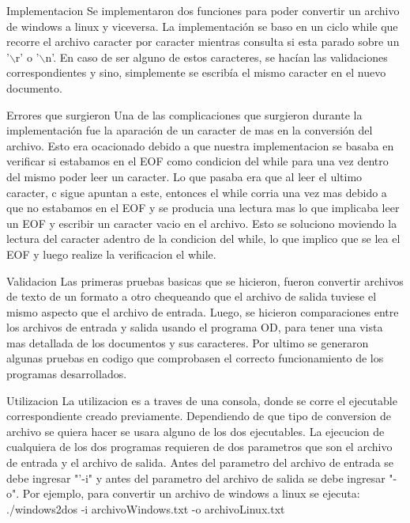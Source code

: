 \documentclass[11pt]{article}
\begin{document}
Implementacion
Se implementaron dos funciones para poder convertir un archivo de windows a linux y viceversa. La implementaci\'on se baso en un ciclo while que recorre el archivo caracter por caracter mientras consulta si esta parado sobre un '$\backslash$r' o '$\backslash$n'. En caso de ser alguno de estos caracteres, se hac\'ian las validaciones correspondientes y sino, simplemente se escribía el mismo caracter en el  nuevo documento.

Errores que surgieron 
Una de las complicaciones que surgieron durante la implementaci\'on fue la aparaci\'on de un caracter de mas en la conversi\'on del archivo. Esto era ocacionado debido a que nuestra implementacion se basaba en verificar si estabamos en el EOF como condicion del while para una vez dentro del mismo poder leer un caracter. Lo que pasaba era que al leer el ultimo caracter, c sigue apuntan a este, entonces el while corria una vez mas debido a que no estabamos en el EOF y se producia una lectura mas lo que implicaba leer un EOF y escribir un caracter vacio en el archivo. Esto se soluciono moviendo la lectura del caracter adentro de la condicion del while, lo que implico que se lea el EOF y luego realize la verificacion el while.


Validacion
Las primeras pruebas basicas que se hicieron, fueron convertir archivos de texto de un formato a otro chequeando que el archivo de salida tuviese el mismo aspecto que el archivo de entrada. Luego, se hicieron comparaciones entre los archivos de entrada y salida usando el programa OD, para tener una vista mas detallada de los documentos y sus caracteres. Por ultimo se generaron algunas pruebas en codigo que comprobasen el correcto funcionamiento de los programas desarrollados.

Utilizacion
La utilizacion es a traves de una consola, donde se corre el ejecutable correspondiente creado previamente. Dependiendo de que tipo de conversion de archivo se quiera hacer se usara alguno de los dos ejecutables. La ejecucion de cualquiera de los dos programas requieren de dos parametros que son el archivo de entrada y el archivo de salida. Antes del parametro del archivo de entrada se debe ingresar "'-i" y antes del parametro del archivo de salida se debe ingresar "-o". Por ejemplo, para convertir un archivo de windows a linux se ejecuta: ./windows2dos -i archivoWindows.txt -o archivoLinux.txt
\end{document}
